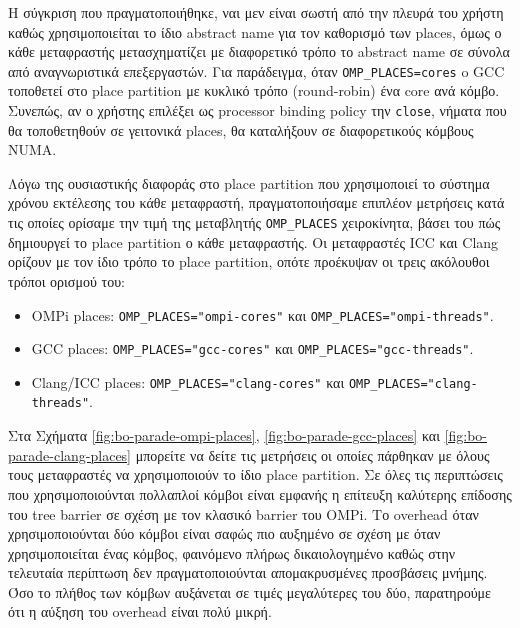 
Η σύγκριση που πραγματοποιήθηκε, ναι μεν είναι σωστή από την πλευρά του χρήστη καθώς χρησιμοποιείται το ίδιο abstract name για τον καθορισμό των places, όμως ο κάθε μεταφραστής μετασχηματίζει με διαφορετικό τρόπο το abstract name σε σύνολα από αναγνωριστικά επεξεργαστών. Για παράδειγμα, όταν \texttt{OMP\_PLACES=cores} o GCC τοποθετεί στο place partition με κυκλικό τρόπο (round-robin) ένα core ανά κόμβο. Συνεπώς, αν ο χρήστης επιλέξει ως processor binding policy την \texttt{close}, νήματα που θα τοποθετηθούν σε γειτονικά places, θα καταλήξουν σε διαφορετικούς κόμβους NUMA.

Λόγω της ουσιαστικής διαφοράς στο place partition που χρησιμοποιεί το σύστημα χρόνου εκτέλεσης του κάθε μεταφραστή, πραγματοποιήσαμε επιπλέον μετρήσεις κατά τις οποίες ορίσαμε την τιμή της μεταβλητής \texttt{OMP\_PLACES} χειροκίνητα, βάσει του πώς δημιουργεί το place partition ο κάθε μεταφραστής. Οι μεταφραστές ICC και Clang ορίζουν με τον ίδιο τρόπο το place partition, οπότε προέκυψαν οι τρεις ακόλουθοι τρόποι ορισμού του:
\begin{itemize}
	\item OMPi places: \texttt{OMP\_PLACES="ompi-cores"} και \texttt{OMP\_PLACES="ompi-threads"}.
	\item GCC places: \texttt{OMP\_PLACES="gcc-cores"} και \texttt{OMP\_PLACES="gcc-threads"}.
	\item Clang/ICC places: \texttt{OMP\_PLACES="clang-cores"} και \texttt{OMP\_PLACES="clang-threads"}.
\end{itemize}

Στα Σχήματα \ref{fig:bo-parade-ompi-places}, \ref{fig:bo-parade-gcc-places} και \ref{fig:bo-parade-clang-places} μπορείτε να δείτε τις μετρήσεις οι οποίες πάρθηκαν με όλους τους μεταφραστές να χρησιμοποιούν το ίδιο place partition. Σε όλες τις περιπτώσεις που χρησιμοποιούνται πολλαπλοί κόμβοι είναι εμφανής η επίτευξη καλύτερης επίδοσης του tree barrier σε σχέση με τον κλασικό barrier του OMPi. Το overhead όταν χρησιμοποιούνται δύο κόμβοι είναι σαφώς πιο αυξημένο σε σχέση με όταν χρησιμοποιείται ένας κόμβος, φαινόμενο πλήρως δικαιολογημένο καθώς στην τελευταία περίπτωση δεν πραγματοποιούνται απομακρυσμένες προσβάσεις μνήμης. Όσο το πλήθος των κόμβων αυξάνεται σε τιμές μεγαλύτερες του δύο, παρατηρούμε ότι η αύξηση του overhead είναι πολύ μικρή. %

